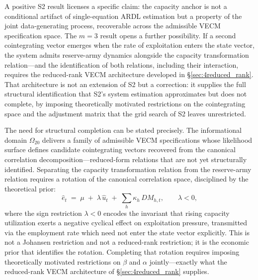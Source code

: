 \documentclass[11pt,a4paper]{article}
\begin{document}

A positive S2 result licenses a specific claim: the capacity
anchor is not a conditional artifact of single-equation ARDL estimation but a
property of the joint data-generating process, recoverable across the
admissible VECM specification space. The $m = 3$ result opens a further
possibility. If a second cointegrating vector emerges when the rate of
exploitation enters the state vector, the system admits reserve-army dynamics
alongside the capacity transformation relation---and the identification of
both relations, including their interaction, requires the reduced-rank VECM
architecture developed in \S\ref{sec:4reduced_rank}. That architecture is not an
extension of S2 but a correction: it supplies the full structural
identification that S2's system estimation approximates but does not
complete, by imposing theoretically motivated restrictions on the
cointegrating space and the adjustment matrix that the grid search of S2
leaves unrestricted.


The need for structural completion can be stated precisely. The informational
domain $\Omega_{20}$ delivers a family of admissible VECM specifications
whose likelihood surface defines candidate cointegrating vectors recovered
from the canonical correlation decomposition---reduced-form relations that
are not yet structurally identified. Separating the capacity transformation
relation from the reserve-army relation requires a rotation of the canonical
correlation space, disciplined by the theoretical prior:
%
\begin{equation}
	\label{eq:S2_rotation}
	\hat{e}_t \;=\; \mu \;+\; \lambda\,\hat{u}_t
	\;+\; \sum_{h} \kappa_h \, DM_{h,t},
	\qquad \lambda < 0,
\end{equation}
%
where the sign restriction $\lambda < 0$ encodes the invariant that rising
capacity utilization exerts a negative cyclical effect on exploitation
pressure, transmitted via the employment rate which need not enter the state
vector explicitly. This is not a Johansen restriction and not a reduced-rank
restriction; it is the economic prior that identifies the rotation. Completing
that rotation requires imposing theoretically motivated restrictions on
$\beta$ and $\alpha$ jointly---exactly what the reduced-rank VECM
architecture of \S\ref{sec:4reduced_rank} supplies.
\end{document}
